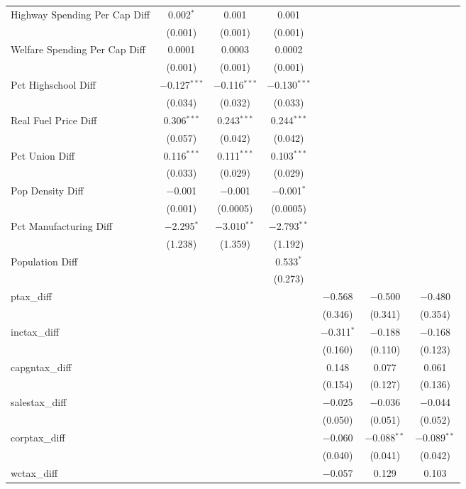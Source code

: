 \begin{table}[!htbp]
\begin{tabular}{@{\extracolsep{5pt}}lcccccc}
  Highway Spending Per Cap Diff & 0.002$^{*}$ & 0.001 & 0.001 &  &  &  \\ 
  & (0.001) & (0.001) & (0.001) &  &  &  \\ 
  Welfare Spending Per Cap Diff & 0.0001 & 0.0003 & 0.0002 &  &  &  \\ 
  & (0.001) & (0.001) & (0.001) &  &  &  \\ 
  Pct Highschool Diff & $-$0.127$^{***}$ & $-$0.116$^{***}$ & $-$0.130$^{***}$ &  &  &  \\ 
  & (0.034) & (0.032) & (0.033) &  &  &  \\ 
  Real Fuel Price Diff & 0.306$^{***}$ & 0.243$^{***}$ & 0.244$^{***}$ &  &  &  \\ 
  & (0.057) & (0.042) & (0.042) &  &  &  \\ 
  Pct Union Diff & 0.116$^{***}$ & 0.111$^{***}$ & 0.103$^{***}$ &  &  &  \\ 
  & (0.033) & (0.029) & (0.029) &  &  &  \\ 
  Pop Density Diff & $-$0.001 & $-$0.001 & $-$0.001$^{*}$ &  &  &  \\ 
  & (0.001) & (0.0005) & (0.0005) &  &  &  \\ 
  Pct Manufacturing Diff & $-$2.295$^{*}$ & $-$3.010$^{**}$ & $-$2.793$^{**}$ &  &  &  \\ 
  & (1.238) & (1.359) & (1.192) &  &  &  \\ 
  Population Diff &  &  & 0.533$^{*}$ &  &  &  \\ 
  &  &  & (0.273) &  &  &  \\ 
  ptax\_diff &  &  &  & $-$0.568 & $-$0.500 & $-$0.480 \\ 
  &  &  &  & (0.346) & (0.341) & (0.354) \\ 
  inctax\_diff &  &  &  & $-$0.311$^{*}$ & $-$0.188 & $-$0.168 \\ 
  &  &  &  & (0.160) & (0.110) & (0.123) \\ 
  capgntax\_diff &  &  &  & 0.148 & 0.077 & 0.061 \\ 
  &  &  &  & (0.154) & (0.127) & (0.136) \\ 
  salestax\_diff &  &  &  & $-$0.025 & $-$0.036 & $-$0.044 \\ 
  &  &  &  & (0.050) & (0.051) & (0.052) \\ 
  corptax\_diff &  &  &  & $-$0.060 & $-$0.088$^{**}$ & $-$0.089$^{**}$ \\ 
  &  &  &  & (0.040) & (0.041) & (0.042) \\ 
  wctax\_diff &  &  &  & $-$0.057 & 0.129 & 0.103 \\ 

\end{tabular}
\end{table}
